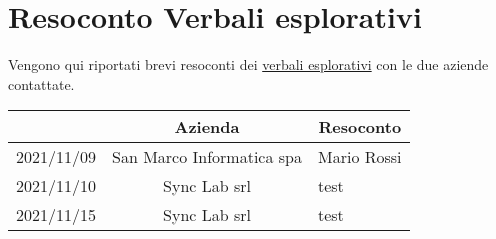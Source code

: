 \section{Resoconto Verbali esplorativi}\label{section:resoconto_verbali}

Vengono qui riportati brevi resoconti dei \href{https://yakuzaishi-swe.github.io/docs/}{verbali esplorativi} con le due aziende contattate.

\begin{center}
	\renewcommand{\arraystretch}{1.8}
	\begin{longtable}[c]{c | c | p{5cm}}
		\rowcolor[HTML]{125E28}
		\multicolumn{1}{c}{\color[HTML]{FFFFFF} \textbf{Data}} & 
		\multicolumn{1}{c}{\color[HTML]{FFFFFF} \textbf{Azienda}} & 
		\multicolumn{1}{c}{\color[HTML]{FFFFFF} \textbf{Resoconto}} \\
		\endhead
		2021/11/09 & San Marco Informatica spa & Mario Rossi \\
        2021/11/10 & Sync Lab srl & test \\
        2021/11/15 & Sync Lab srl & test \\

	\end{longtable}
\end{center}
